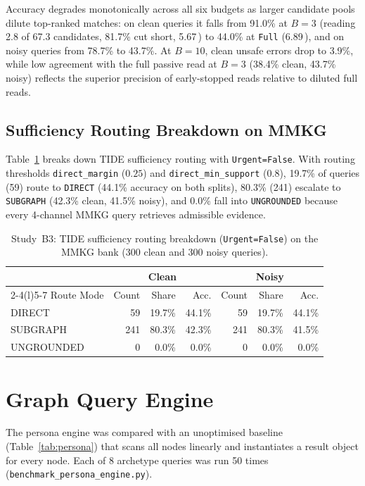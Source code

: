 \documentclass[12pt,a4paper,oneside]{report}
\newcommand{\code}[1]{\texttt{\small #1}}
\newcommand{\ms}{\,\text{ms}}
\begin{document}
Accuracy degrades monotonically across all six budgets as larger candidate pools dilute top-ranked matches: on clean queries it falls from 91.0\% at $B=3$ (reading 2.8 of 67.3 candidates, 81.7\% cut short, 5.67\ms{}) to 44.0\% at \code{Full} (6.89\ms{}), and on noisy queries from 78.7\% to 43.7\%. At $B=10$, clean unsafe errors drop to 3.9\%, while low agreement with the full passive read at $B=3$ (38.4\% clean, 43.7\% noisy) reflects the superior precision of early-stopped reads relative to diluted full reads.

\subsection{Sufficiency Routing Breakdown on MMKG}
Table~\ref{tab:mmkg-routing} breaks down TIDE sufficiency routing with \code{Urgent=False}. With routing thresholds \code{direct\_margin} ($0.25$) and \code{direct\_min\_support} ($0.8$), 19.7\% of queries (59) route to \code{DIRECT} (44.1\% accuracy on both splits), 80.3\% (241) escalate to \code{SUBGRAPH} (42.3\% clean, 41.5\% noisy), and 0.0\% fall into \code{UNGROUNDED} because every 4-channel MMKG query retrieves admissible evidence.

\begin{table}[H]
\centering
\caption{Study~B3: TIDE sufficiency routing breakdown (\code{Urgent=False}) on the MMKG bank (300 clean and 300 noisy queries).}
\label{tab:mmkg-routing}
\small
\begin{tabular}{@{}l rrr rrr@{}}
\toprule
& \multicolumn{3}{c}{Clean} & \multicolumn{3}{c}{Noisy}\\
\cmidrule(lr){2-4}\cmidrule(l){5-7}
Route Mode & Count & Share & Acc. & Count & Share & Acc.\\
\midrule
DIRECT & 59 & 19.7\% & 44.1\% & 59 & 19.7\% & 44.1\%\\
SUBGRAPH & 241 & 80.3\% & 42.3\% & 241 & 80.3\% & 41.5\%\\
UNGROUNDED & 0 & 0.0\% & 0.0\% & 0 & 0.0\% & 0.0\%\\
\bottomrule
\end{tabular}
\end{table}

\section{Graph Query Engine}\label{sec:res-persona}
The persona engine was compared with an unoptimised baseline (Table~\ref{tab:persona}) that scans all nodes linearly and instantiates a result object for every node. Each of 8 archetype queries was run 50 times (\code{benchmark\_persona\_engine.py}).
\end{document}
